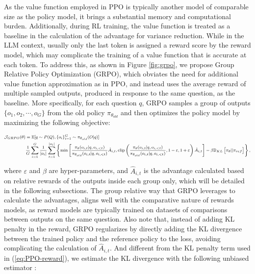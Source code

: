 \begin{itemize}[topsep=0pt]
\begin{itemize}[topsep=0pt]
As the value function employed in PPO is typically another model of comparable size as the policy model, it brings a substantial memory and computational burden. Additionally, during RL training, the value function is treated as a baseline in the calculation of the advantage for variance reduction. While in the LLM context, usually only the last token is assigned a reward score by the reward model, which may complicate the training of a value function that is accurate at each token. To address this, as shown in Figure \ref{fig:grpo}, we propose Group Relative Policy Optimization (GRPO), which obviates the need for additional value function approximation as in PPO, and instead uses the average reward of multiple sampled outputs, produced in response to the same question, as the baseline. More specifically, for each question $q$, GRPO samples a group of outputs $\{o_1, o_2, \cdots, o_G\}$  from the old policy  $\pi_{\theta_{old}}$  and then optimizes the policy model by maximizing the following objective:

\begin{equation}
\footnotesize
\begin{split}
    \mathcal{J}_{GRPO}(\theta) &= \mathbb{E}{[q \sim P(Q), \{o_i\}_{i=1}^G \sim \pi_{\theta_{old}}(O|q)]}  \\
    & \frac{1}{G}\sum_{i=1}^G\frac{1}{|o_i|} \sum_{t=1}^{|o_i|} \left\{ \min \left[ \frac{\pi_\theta(o_{i,t} | q, o_{i,<t})}{\pi_{\theta_{old}}(o_{i,t} | q, o_{i,<t})} \hat{A}_{i,t}, \text{clip} \left( \frac{\pi_\theta(o_{i,t} | q, o_{i,<t})}{\pi_{\theta_{old}}(o_{i,t} | q, o_{i,<t})}, 1 - \varepsilon, 1 + \varepsilon \right)  \hat{A}_{i,t} \right] - \beta \mathbb{D}_{KL}\left[\pi_{\theta} || \pi_{ref}\right]\right\} ,
\end{split}
\label{eq:GRPO-obj}
\end{equation}

where $\varepsilon$ and $\beta$ are hyper-parameters, and $\hat{A}_{i,t}$  is the advantage calculated based on relative rewards of the outputs inside each group only, which will be detailed in the following subsections. The group relative way that GRPO leverages to calculate the advantages, aligns well with the comparative nature of rewards models,  as reward models are typically trained on datasets of comparisons between outputs on the same question. Also note that, instead of adding KL penalty in the reward, GRPO regularizes by directly adding the KL divergence between the trained policy and the reference policy to the loss, avoiding complicating the calculation of  $\hat{A}_{i,t}$. And different from the KL penalty term used in (\ref{eq:PPO-reward}), we estimate the KL divergence with the following unbiased estimator \citep{kl_approx}:


\end{itemize}
\end{itemize}

